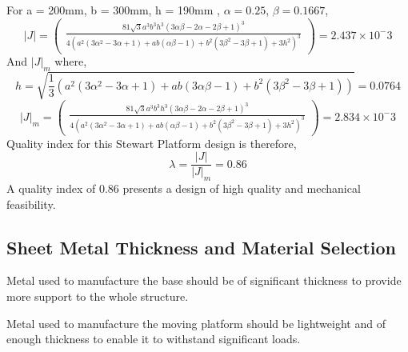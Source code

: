 For a = 200mm, b = 300mm, h = 190mm , $\alpha = 0.25$, $ \beta = 0.1667$,
\begin{equation}
|J| =
\begin{pmatrix}
\frac{81 \sqrt{3} a^3 b^3 h^3 (3 \alpha \beta - 2 \alpha - 2 \beta +1)^3}{4(a^2(3 \alpha^2 - 3 \alpha + 1)+ ab(\alpha \beta - 1 )+ b^2(3 \beta^2 - 3 \beta + 1)+ 3h^2)^3}
\end{pmatrix}
= 2.437 \times 10^-3
\label{eq:myeqn}
\end{equation}
And $ |J|_{m}$ where,
\begin{equation}
h = \sqrt{\frac{1}{3}(a^2 (3 \alpha^2 - 3 \alpha + 1)+ ab (3\alpha\beta - 1)+b^2(3 \beta^2 - 3 \beta + 1))} = 0.0764
\label{eq:myeqn}
\end{equation}
\begin{equation}
|J|_{m} =
\begin{pmatrix}
\frac{81 \sqrt{3} a^3 b^3 h^3 (3 \alpha \beta - 2 \alpha - 2 \beta +1)^3}{4(a^2(3 \alpha^2 - 3 \alpha + 1)+ ab(\alpha \beta - 1 )+ b^2(3 \beta^2 - 3 \beta + 1)+ 3h^2)^3}
\end{pmatrix}
= 2.834 \times 10^-3
\label{eq:myeqn}
\end{equation}
Quality index for this Stewart Platform design is therefore, 
\begin{equation}
\lambda = \frac{|J|}{|J|_{m}} = 0.86
\label{eq:myeqn}
\end{equation}
A quality index of 0.86 presents a design of high quality and mechanical feasibility.
\subsection{Sheet Metal Thickness and Material Selection}
Metal used to manufacture the base should be of significant thickness to provide more support to the whole structure.

Metal used to manufacture the moving platform should be lightweight and of enough thickness to enable it to withstand significant loads.

